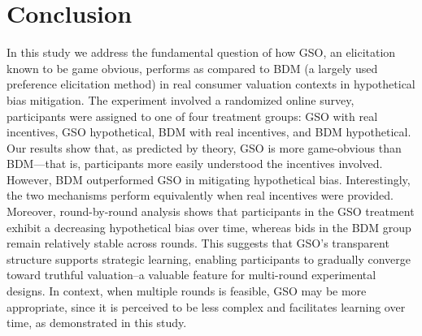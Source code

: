 \documentclass[12pt]{article}
\begin{document}
 




\section{Conclusion}
\label{Conclusion}

In this study we address the fundamental question of how GSO, an elicitation known to be game obvious, performs as compared to BDM (a largely used preference elicitation method) in real consumer valuation contexts in hypothetical bias mitigation. The experiment involved a randomized online survey, participants were assigned to one of four treatment groups: GSO with real incentives, GSO hypothetical, BDM with real incentives, and BDM hypothetical. Our results show that, as predicted by theory, GSO is more game-obvious than BDM—that is, participants more easily understood the incentives involved. However, BDM outperformed GSO in mitigating hypothetical bias. Interestingly, the two mechanisms perform equivalently when real incentives were provided. Moreover, round-by-round analysis shows that participants in the GSO treatment exhibit a decreasing hypothetical bias over time, whereas bids in the BDM group remain relatively stable across rounds. This suggests that GSO’s transparent structure supports strategic learning, enabling participants to gradually converge toward truthful valuation--a valuable feature for multi-round experimental designs. 
In context, when multiple rounds is feasible, GSO may be more appropriate, since it is perceived to be less complex and facilitates learning over time, as demonstrated in this study. 
\end{document}
